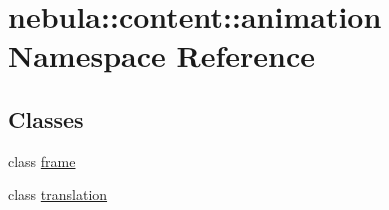 \hypertarget{namespacenebula_1_1content_1_1animation}{
\section{nebula::content::animation Namespace Reference}
\label{namespacenebula_1_1content_1_1animation}
}
\subsection*{Classes}
\begin{DoxyCompactItemize}
\item 
class \hyperlink{classnebula_1_1content_1_1animation_1_1frame}{frame}
\item 
class \hyperlink{classnebula_1_1content_1_1animation_1_1translation}{translation}
\end{DoxyCompactItemize}
